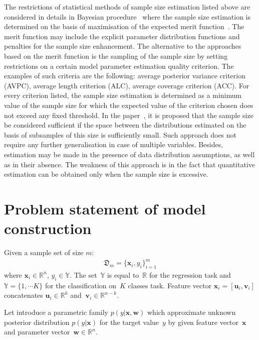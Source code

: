 \documentclass[
11pt,%
tightenlines,%
twoside,%
onecolumn,%
nofloats,%
nobibnotes,%
nofootinbib,%
superscriptaddress,%
noshowpacs,%
centertags]%
{revtex4}
\begin{document}
The restrictions of statistical methods of sample size estimation listed above are considered in details in Bayesian procedure~\cite{lindley1997, rubin1998, wang2002} where the sample size estimation is determined on the basis of maximisation of the expected merit function~\cite{lindley1997}. The merit function may include the explicit parameter distribution functions and penalties for the sample size enhancement. The alternative to the approaches~\cite{wang2002} based on the merit function is the sampling of the sample size by setting restrictions on a certain model parameter estimation quality criterion. The examples of such criteria are the following: average  posterior variance criterion (AVPC), average length criterion (ALC), average coverage criterion (ACC). For every criterion listed, the sample size estimation is determined as a minimum value of the sample size for which the expected value of the criterion chosen does not exceed any fixed threshold. In the paper~\cite{motrenko2014}, it is proposed that the sample size be considered sufficient  if the space between the distributions estimated on the basis of subsamples of this size is sufficiently small. Such approach does not require any further generalisation in case of multiple variables. Besides, estimation may be made in the presence of data distribution assumptions, as well as in their absence. The weakness of this approach is in the fact that quantitative estimation can be obtained only when the sample size is excessive. 

\section{Problem statement of model construction}

Given a sample set of size $m$:
\[
\label{eq:ps:1}
\begin{aligned}
	\mathfrak{D}_{m} = \{\textbf{x}_i, y_i\}_{i = 1}^{m}
\end{aligned}
\]
where $\textbf{x}_i\in \mathbb{R}^{n}$, $y_i\in \mathbb{Y}$. The set~$\mathbb{Y}$ is equal to~$\mathbb{R}$ for the regression task and~$\mathbb{Y}=\{1,\cdots K\}$ for the classification on~$K$ classes task. Feature vector $\textbf{x}_{i} = [\textbf{u}_{i}, \textbf{v}_{i}]$ concatenates $\textbf{u}_i\in \mathbb{R}^{k}$ and $~\textbf{v}_i\in \mathbb{R}^{n-k}$.

Let introduce a parametric family $p(y|\textbf{x}, \textbf{w})$ which approximate unknown posterior distribution $p(y|\textbf{x})$ for the target value~$y$ by given feature vector~$\textbf{x}$ and parameter vector~$\textbf{w}\in \mathbb{R}^{n}$.
\end{document}
